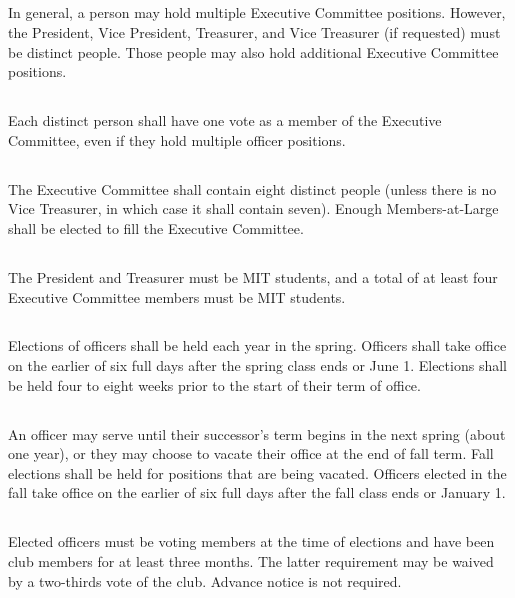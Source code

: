 \documentclass{bylaws}
\begin{document}
\subsection{}In general, a person may hold multiple Executive Committee positions. However, the President, Vice President, Treasurer, and Vice Treasurer (if requested) must be distinct people. Those people may also hold additional Executive Committee positions.
\subsection{}Each distinct person shall have one vote as a member of the Executive Committee, even if they hold multiple officer positions.
\subsection{}The Executive Committee shall contain eight distinct people (unless there is no Vice Treasurer, in which case it shall contain seven). Enough Members-at-Large shall be elected to fill the Executive Committee.
\subsection{}The President and Treasurer must be MIT students, and a total of at least four Executive Committee members must be MIT students.



\subsection{}Elections of officers shall be held each year in the spring. Officers shall take office on the earlier of six full days after the spring class ends or June 1. Elections shall be held four to eight weeks prior to the start of their term of office.
\subsection{}An officer may serve until their successor's term begins in the next spring (about one year), or they may choose to vacate their office at the end of fall term. Fall elections shall be held for positions that are being vacated. Officers elected in the fall take office on the earlier of six full days after the fall class ends or January 1.
\subsection{}Elected officers must be voting members at the time of elections and have been club members for at least three months. The latter requirement may be waived by a two-thirds vote of the club. Advance notice is not required.
\end{document}
